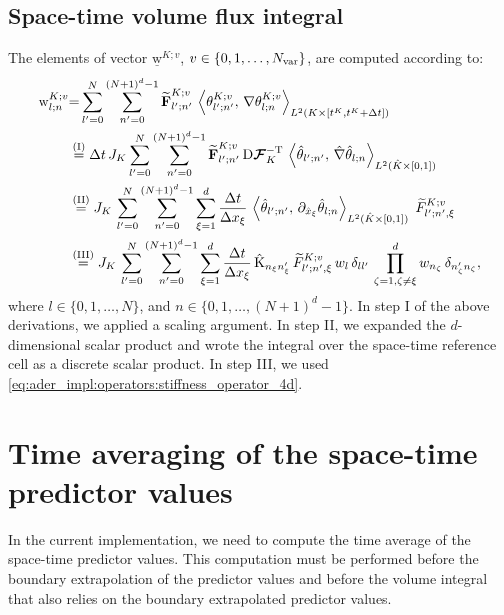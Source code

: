 \documentclass{scrreprt}
\theoremstyle{definition}
\theoremstyle{nonumberplain}
\renewcommand{\vec}[1]{{\textbf{#1}}}
\newcommand{\stvec}[1]{\widetilde{\vec{#1}}}
\newcommand{\laVec}[1]{\underline{\mathrm{#1}}}
\newcommand{\laVecel}[1]{\mathrm{#1}}
\newcommand{\laMatel}[1]{\mathrm{#1}}
\newcommand{\cell}{K}
\newcommand{\dt}{\textup{d}t}
\newcommand{\dV}{\text{d}\vec{x}}
\newcommand{\refVec}[1]{\hat{\vec{#1}}}
\newcommand{\refCell}{\hat{\cell}}
\newcommand{\jacobian}{\textup{D}\boldsymbol{\mathcal{F}}_{\cell}}
\newcommand{\detJ}{J_\cell}
\newcommand{\refdV}{\textup{d}\hat{\vec{x}}}
\newcommand{\refdt}{\textup{d}\hat{t}}
\begin{document}
\subsection{Space-time volume flux integral}
\label{sec:ader_impl:predictor:space_time_volume_flux_integral}
The elements of vector $\laVec{w}^{\cell;v}$,
$v\in\{0,1,\ldots,N_\textup{var}\}$, are computed according to:
\begin{align}
\laVecel{w}^{\cell;v}_{l;n}
&{=}
\sum_{l'=0}^{N}
\sum_{n'=0}^{(N+1)^d-1}
\stvec{F}^{K;v}_{l';n'}\,
\left\langle
\theta^{K;v}_{l';n'},\,
\nabla
\theta^{K;v}_{l;n}
\right\rangle
_{L^2(\cell\times[t^\cell,t^\cell+\Delta t])}
\notag
\\
&\overset{(\textup{I})}
{=}
\Delta t\,
\detJ
\sum_{l'=0}^{N}
\sum_{n'=0}^{(N+1)^d-1}
\stvec{F}^{K;v}_{l';n'}\,
\jacobian^{-\textup{T}}\,
\left\langle
\hat{\theta}_{l';n'},\,
\hat{\nabla}
\hat{\theta}_{l;n}
\right\rangle
_{L^2(\refCell\times[0,1])}
\notag
\\
&\overset{(\textup{II})}
{=}
\detJ\,
\sum_{l'=0}^{N}
\sum_{n'=0}^{(N+1)^d-1}
\sum_{\xi=1}^d
\frac{\Delta t}{\Delta x_{\xi}}\,
\left\langle
\hat{\theta}_{l';n'},\,
\partial_{\hat{x}_\xi}\hat{\theta}_{l;n}
\right\rangle
_{L^2(\refCell\times[0,1])}
\;\widetilde{F}^{\cell;v}_{l';n',\xi}
\notag
\\
&\overset{(\textup{III})}
{=}
\detJ\,
\sum_{l'=0}^{N}
\sum_{n'=0}^{(N+1)^d-1}
\sum_{\xi =1}^d
\frac{\Delta t}{\Delta x_{\xi}}\,
\laMatel{\refCell}_{n_\xi n'_\xi}\,
\widetilde{F}^{\cell;v}_{l';n',\xi}\,
w_{l}\,
\delta_{ll'}\,
\prod_{\zeta=1,\zeta\neq\xi}^d
w_{n_\zeta}\,
\delta_{n'_\zeta n_\zeta},
\end{align}
where $l\in\{0,1,\ldots,N\}$, and
$n\in\{0,1,\ldots,(N+1)^{d}-1\}$.
In step I of the above derivations, we applied a scaling argument.
In step II, we expanded the $d$-dimensional scalar
product and wrote the integral over the space-time reference cell as a
discrete scalar product.
In step III, we used \eqref{eq:ader_impl:operators:stiffness_operator_4d}.

\section{Time averaging of the space-time predictor values}
In the current implementation, we need to compute the time average of the
space-time predictor values.
This computation must be performed before the boundary extrapolation of
the predictor values and before the volume integral that also
relies on the boundary extrapolated predictor values.
\end{document}
